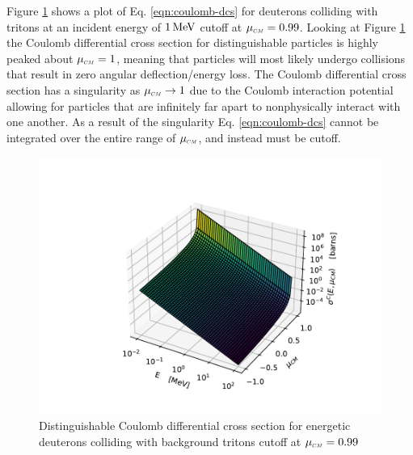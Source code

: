 Figure \ref{fig:sigma_c} shows a plot of Eq. \eqref{eqn:coulomb-dcs} for deuterons colliding with tritons at an incident energy of $1 \,\text{MeV}$ cutoff at $\mucm = 0.99$. Looking at Figure \ref{fig:sigma_c} the Coulomb differential cross section for distinguishable particles is highly peaked about $\mucm = 1$, meaning that particles will most likely undergo collisions that result in zero angular deflection/energy loss. The Coulomb differential cross section has a singularity as $\mucm \rightarrow 1$ due to the Coulomb interaction potential allowing for particles that are infinitely far apart to nonphysically interact with one another. As a result of the singularity Eq. \eqref{eqn:coulomb-dcs} cannot be integrated over the entire range of $\mucm$, and instead must be cutoff. 
\begin{figure}[!htb]
    \centering
    \includegraphics[]{../figures/interaction_physics/sigma-C.pdf}
    \caption{Distinguishable Coulomb differential cross section for energetic deuterons colliding with background tritons cutoff at $\mucm = 0.99$}
    \label{fig:sigma_c}
\end{figure}

